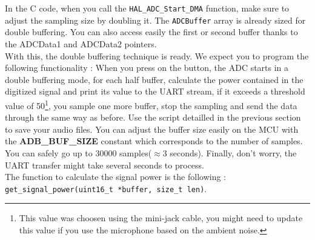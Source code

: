 
\noindent In the C code, when you call the \texttt{HAL\_ADC\_Start\_DMA} function, make sure to adjust the sampling size by doubling it. The \texttt{ADCBuffer} array is already sized for double buffering. You can also access easily the first or second buffer thanks to the ADCData1 and ADCData2 pointers.\\

\noindent With this, the double buffering technique is ready. We expect you to program the following functionality : When you press on the button, the ADC starts in a double buffering mode, for each half buffer, calculate the power contained in the digitized signal and print its value to the UART stream, if it exceeds a threshold value of 50\footnote{This value was choosen using the mini-jack cable, you might need to update this value if you use the microphone based on the ambient noise.}, you sample one more buffer, stop the sampling and send the data through the same way as before. Use the script detailled in the previous section to save your audio files. You can adjust the buffer size easily on the MCU with the \textbf{ADB\_BUF\_SIZE} constant which corresponds to the number of samples. You can safely go up to 30000 samples($\approx$3 seconds). Finally, don't worry, the UART transfer might take several seconds to process. \\

\noindent The function to calculate the signal power is the following : \texttt{get\_signal\_power(uint16\_t *buffer, size\_t len)}.


